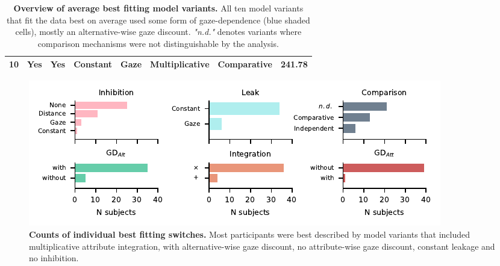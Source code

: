 \documentclass[11pt, a4paper]{article}
\begin{document}
\begin{refsection}
\begin{table}[!ht]
\begin{centering}
\begin{tabular}{@{}cccccccc@{}}
10   & \cellcolor[HTML]{DAE8FC}\textbf{Yes} & \cellcolor[HTML]{DAE8FC}\textbf{Yes} & Constant                     & \cellcolor[HTML]{DAE8FC}\textbf{Gaze} & Multiplicative & Comparative   & 241.78 \\ \bottomrule
\end{tabular}
\caption{\textbf{Overview of average best fitting model variants.} All ten model variants that fit the data best on average used some form of gaze-dependence (blue shaded cells), mostly an alternative-wise gaze discount. \textit{"n.d."} denotes variants where comparison mechanisms were not distinguishable by the analysis.}
\label{tab:switchboard-best-agg}
\end{centering}
\end{table}
\clearpage


\begin{figure}[!ht]
\begin{centering}
\includegraphics[scale=1]{../figures/S_switch-level_individual_counts.pdf}
\caption{\textbf{Counts of individual best fitting switches.} Most participants were best described by model variants that included multiplicative attribute integration, with alternative-wise gaze discount, no attribute-wise gaze discount, constant leakage and no inhibition.}
\label{fig:switchboard-ind-switch-counts}
\end{centering}
\end{figure}
\clearpage



\end{refsection}
\end{document}
